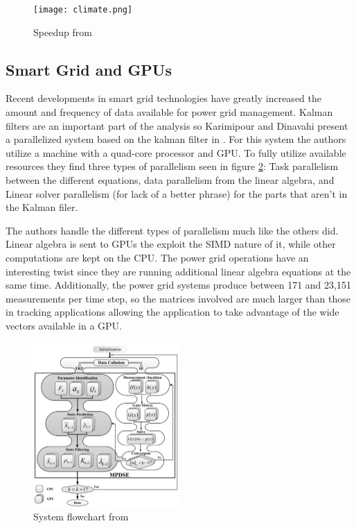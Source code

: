 \documentclass[11pt]{article}
\begin{document}
\begin{figure}
\centering
\texttt{[image: climate.png]}
\caption{Speedup from \cite{lyster1997parallel}}
\label{fig:climate}
\end{figure}



\subsection{Smart Grid and GPUs}
Recent developments in smart grid technologies have greatly increased the amount and frequency of data available for power grid management. Kalman filters are an important part of the analysis so Karimipour and Dinavahi present a parallelized system based on the kalman filter in \cite{karimipour2015extended}. For this system the authors utilize a machine with a quad-core processor and GPU. To fully utilize available resources they find three types of parallelism seen in figure \ref{fig:mpdse}: Task parallelism between the different equations, data parallelism from the linear algebra, and Linear solver parallelism (for lack of a better phrase) for the parts that aren't in the Kalman filer.

The authors handle the different types of parallelism much like the others did. Linear algebra is sent to GPUs the exploit the SIMD nature of it, while other computations are kept on the CPU. The power grid operations have an interesting twist since they are running additional linear algebra equations at the same time. Additionally, the power grid systems produce between 171 and 23,151 measurements per time step, so the matrices involved are much larger than those in tracking applications allowing the application to take advantage of the wide vectors available in a GPU.


\begin{figure}
\centering
\includegraphics[width=0.5\textwidth]{mpdse.png}
\caption{System flowchart from \cite{karimipour2015extended}}
\label{fig:mpdse}
\end{figure}
\end{document}

